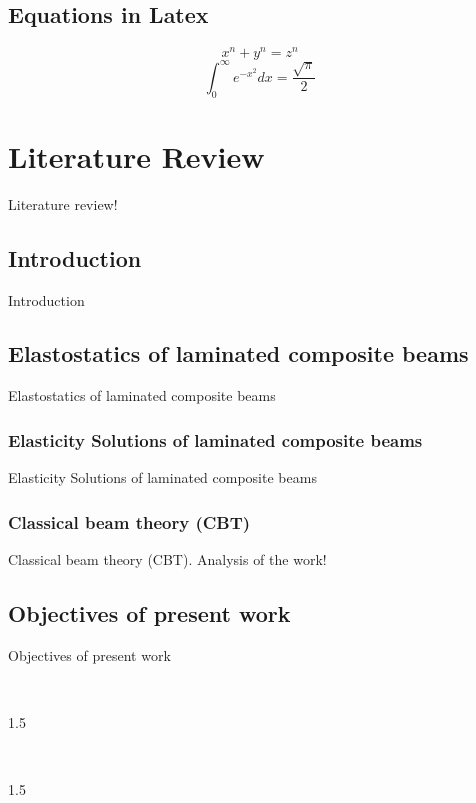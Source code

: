 \documentclass [a4paper]{report}
\begin{document}
{\section{Equations in Latex}
\begin{equation}
 x^n + y^n = z^n 
 \end{equation}
 \begin{equation}
 \int_0^\infty e^{-x^2} dx=\frac{\sqrt{\pi}}{2}
 \end{equation}
 
\chapter{Literature Review}
Literature review!
\section{Introduction}
Introduction
\section{Elastostatics of laminated composite beams}
Elastostatics of laminated composite beams
\subsection{Elasticity Solutions of laminated composite beams}
Elasticity Solutions of laminated composite beams
\subsection{Classical beam theory (CBT)}
Classical beam theory (CBT). Analysis of the work! \cite{article}
\section{Objectives of present work}
Objectives of present work

\newpage
\pagestyle{plain}
{}
{\\}
\begin{spacing}{1.5}
	\renewcommand\bibname{}
	\vspace*{-5\baselineskip}
	\begingroup
	\let\clearpage\relax
	{}
	
	\endgroup
\end{spacing}

\newpage
\pagestyle{plain}
{}
{\\}
\begin{spacing}{1.5}
	\renewcommand\bibname{}
	\vspace*{-5\baselineskip}
	\begingroup
	\let\clearpage\relax
	

\end{spacing}}
\end{document}
